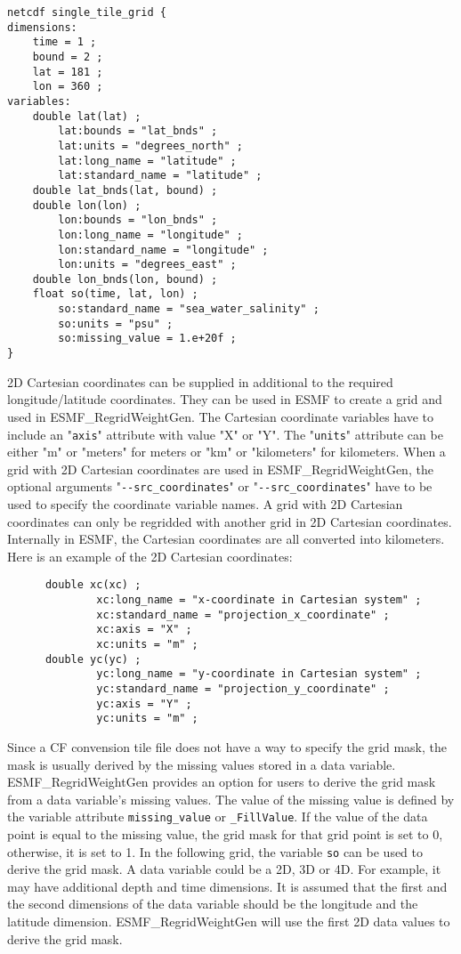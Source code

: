 \begin{verbatim}
netcdf single_tile_grid {
dimensions:
	time = 1 ;
	bound = 2 ;
	lat = 181 ;
	lon = 360 ;
variables:
	double lat(lat) ;
		lat:bounds = "lat_bnds" ;
		lat:units = "degrees_north" ;
		lat:long_name = "latitude" ;
		lat:standard_name = "latitude" ;
	double lat_bnds(lat, bound) ;
	double lon(lon) ;
		lon:bounds = "lon_bnds" ;
		lon:long_name = "longitude" ;
		lon:standard_name = "longitude" ;
		lon:units = "degrees_east" ;
	double lon_bnds(lon, bound) ;
	float so(time, lat, lon) ;
		so:standard_name = "sea_water_salinity" ;
		so:units = "psu" ;
		so:missing_value = 1.e+20f ;
}
\end{verbatim}

2D Cartesian coordinates can be supplied in additional to the required
longitude/latitude coordinates.  They can be used in ESMF to create a grid and
used in ESMF\_RegridWeightGen.   The Cartesian coordinate variables have to
include an "{\tt axis}" attribute with value "X" or "Y".  The "{\tt units}"
attribute can be either "m" or  "meters" for meters or  "km" or  "kilometers"
for kilometers.  When a grid with 2D Cartesian coordinates are used in
ESMF\_RegridWeightGen, the optional arguments "{\tt \verb+--+src\_coordinates}" 
or "{\tt \verb+--+src\_coordinates}" have to be used to specify the coordinate
variable names.  A grid with 2D Cartesian coordinates can only be regridded
with another grid in 2D Cartesian coordinates.  Internally in ESMF, the
Cartesian coordinates are all converted into kilometers.  Here is an example
of the 2D Cartesian coordinates:

\begin{verbatim}
      double xc(xc) ;
              xc:long_name = "x-coordinate in Cartesian system" ;
              xc:standard_name = "projection_x_coordinate" ;
              xc:axis = "X" ;
              xc:units = "m" ;
      double yc(yc) ;
              yc:long_name = "y-coordinate in Cartesian system" ;
              yc:standard_name = "projection_y_coordinate" ;
              yc:axis = "Y" ;
              yc:units = "m" ;
\end{verbatim}


Since a CF convension tile file does not have a way to specify the grid mask, the mask is usually derived by the missing values stored in a data variable.  ESMF\_RegridWeightGen provides an option for users to
derive the grid mask from a data variable's missing values.  The value of the missing value is defined by the
variable attribute {\tt missing\_value} or {\tt \_FillValue}.  If the value of the data point is equal to the
missing value, the grid mask for that grid point is set to 0, otherwise, it is set to 1.   In the following
grid, the variable {\tt so} can be used to derive the grid mask.  A data variable could be a 2D, 3D or 4D.
For example, it may have additional depth and time dimensions.
It is assumed that the first and the second dimensions of the data variable should be the longitude and the
latitude dimension.  ESMF\_RegridWeightGen will use the first 2D data values to derive the grid mask.


